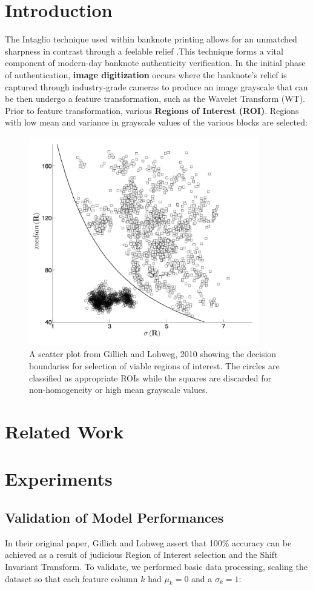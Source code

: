 \documentclass{article}
\begin{document}
\section{Introduction}
The Intaglio technique used within banknote printing allows for an unmatched sharpness in contrast through a feelable relief\cite{intaglio} .This technique forms a vital component of modern-day banknote authenticity verification. In the initial phase of authentication, \textbf{image digitization} occurs where the banknote's relief is captured through industry-grade cameras to produce an image grayscale that can be then undergo a feature transformation, such as the Wavelet Transform (WT). Prior to feature transformation, various \textbf{Regions of Interest (ROI)}.  Regions with low mean and variance in grayscale values of the various blocks are selected:
\begin{figure}
  \caption{A scatter plot from Gillich and Lohweg, 2010 showing the decision boundaries for selection of viable regions of interest. The circles are classified as appropriate ROIs while the squares are discarded for non-homogeneity or high mean grayscale values.}
  \centering
\includegraphics[width=100mm]{roi_selection.png}
\end{figure}
\section{Related Work}

\section{Experiments}

\subsection{Validation of Model Performances}
In their original paper, Gillich and Lohweg assert that 100\% accuracy can be achieved as a result of judicious Region of Interest selection and the Shift Invariant Transform. To validate, we performed basic data processing, scaling the dataset so that each feature column $k$ had $\mu_{k} = 0$ and a $\sigma_{k} = 1$:
\end{document}
